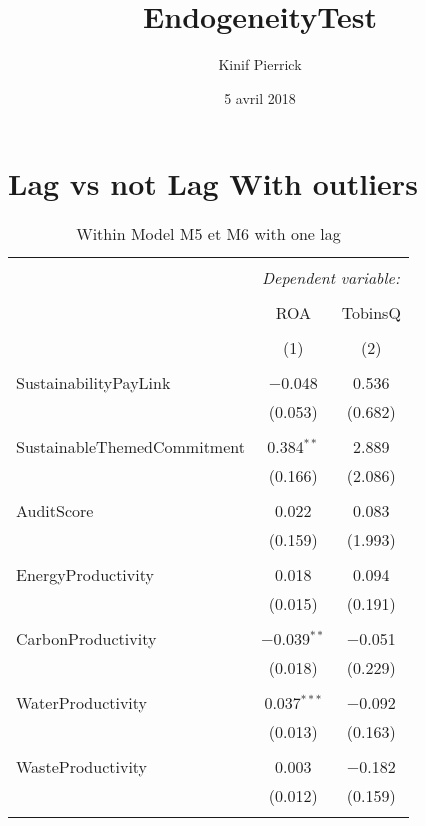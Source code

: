 \documentclass[]{article}
\title{EndogeneityTest}
\author{Kinif Pierrick}
\date{5 avril 2018}
\begin{document}
\maketitle

\section{Lag vs not Lag With
outliers}\label{lag-vs-not-lag-with-outliers}

\begin{table}[h] \centering 
  \caption{Within Model M5 et M6 with one lag} 
  \label{Plm} 
\begin{tabular}{@{\extracolsep{5pt}}lcc} 
\\[-1.8ex]\hline 
\hline \\[-1.8ex] 
 & \multicolumn{2}{c}{\textit{Dependent variable:}} \\ 
\cline{2-3} 
\\[-1.8ex] & ROA & TobinsQ \\ 
\\[-1.8ex] & (1) & (2)\\ 
\hline \\[-1.8ex] 
 SustainabilityPayLink & $-$0.048 & 0.536 \\ 
  & (0.053) & (0.682) \\ 
  & & \\ 
 SustainableThemedCommitment & 0.384$^{**}$ & 2.889 \\ 
  & (0.166) & (2.086) \\ 
  & & \\ 
 AuditScore & 0.022 & 0.083 \\ 
  & (0.159) & (1.993) \\ 
  & & \\ 
 EnergyProductivity & 0.018 & 0.094 \\ 
  & (0.015) & (0.191) \\ 
  & & \\ 
 CarbonProductivity & $-$0.039$^{**}$ & $-$0.051 \\ 
  & (0.018) & (0.229) \\ 
  & & \\ 
 WaterProductivity & 0.037$^{***}$ & $-$0.092 \\ 
  & (0.013) & (0.163) \\ 
  & & \\ 
 WasteProductivity & 0.003 & $-$0.182 \\ 
  & (0.012) & (0.159) \\ 
  & & \\ 

\end{tabular}
\end{table}
\end{document}
